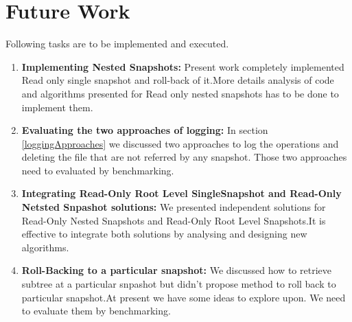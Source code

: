 \section{Future Work}
Following tasks are to be implemented and executed.
\begin{enumerate}
\item \textbf{Implementing Nested Snapshots:}
Present work completely implemented Read only single snapshot and roll-back of it.More details analysis of code and algorithms presented for Read only nested snapshots has to be done to implement them.
\item \textbf{Evaluating the two approaches of logging:}
In section \ref{loggingApproaches} we discussed two approaches to log the operations and deleting the file that are not referred by any snapshot. Those two approaches need to evaluated by benchmarking.
\item \textbf{Integrating Read-Only Root Level SingleSnapshot and Read-Only Netsted Snpashot solutions:}
We presented independent solutions for Read-Only Nested Snapshots and Read-Only Root Level Snapshots.It is effective to integrate both solutions by analysing and designing new algorithms.
\item \textbf{Roll-Backing to a particular snapshot:}
We discussed how to retrieve subtree at a particular snpashot but didn't propose method to roll back to particular snapshot.At present we have some ideas to explore upon. We need to evaluate them by benchmarking.
\end{enumerate}





